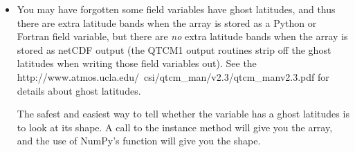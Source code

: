 \begin{description}
\begin{itemize}
	\item You may have forgotten some field variables have
		ghost latitudes, and thus there are extra latitude bands
		when the array is stored as a Python or Fortran field
		variable, but there are \emph{no} extra latitude bands
		when the array is stored as netCDF output (the QTCM1
		output routines strip off the ghost latitudes when
		writing those field variables out).
	        See the
{%
        {http://www.atmos.ucla.edu/~csi/qtcm_man/v2.3/qtcm_manv2.3.pdf}}
        \cite{Neelin/etal:2002}
        for details about ghost latitudes.

		The safest and easiest way to tell whether the variable has a
		ghost latitudes is to look at its shape.
		A call to the  instance
		method  will give you the array,
		and the use of NumPy's  function will give you
		the shape.
	\end{itemize}
\end{description}




